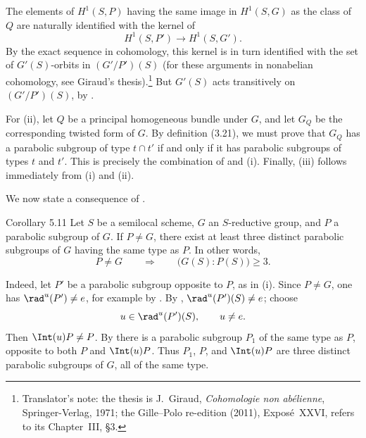 The elements of \(H^1(S,P)\) having the same image in \(H^1(S,G)\)
as the class of \(Q\) are naturally identified with the kernel of
\[
 H^1(S,P')\longrightarrow H^1(S,G').
\]
By the exact sequence in cohomology, this kernel is in turn
identified with the set of \(G'(S)\)-orbits in
\((G'/P')(S)\) (for these arguments in nonabelian cohomology, see
Giraud's thesis).\footnote{Translator's note: the thesis is J.~Giraud,
\textit{Cohomologie non abélienne}, Springer-Verlag, 1971; the Gille--Polo
re-edition (2011), Exposé~XXVI, refers to its Chapter~III, §3.}
But \(G'(S)\) acts transitively on \((G'/P')(S)\), by .

For \textup{(ii)}, let \(Q\) be a principal homogeneous bundle under
\(G\), and let \(G_Q\) be the corresponding twisted form of \(G\).
By definition \textup{(3.21)}, we must prove that \(G_Q\) has a
parabolic subgroup of type \(t\cap t'\) if and only if it has
parabolic subgroups of types \(t\) and \(t'\).  This is precisely the
combination of  and \textup{(i)}.  Finally, \textup{(iii)}
follows immediately from \textup{(i)} and \textup{(ii)}.

We now state a consequence of .

\begin{sgastatement}{Corollary 5.11}
Let \(S\) be a semilocal scheme, \(G\) an \(S\)-reductive group, and
\(P\) a parabolic subgroup of \(G\).  If \(P\ne G\), there exist at
least three distinct parabolic subgroups of \(G\) having the same
type as \(P\).  In other words,
\[
 P\ne G\qquad\Longrightarrow\qquad
 \bigl(G(S):P(S)\bigr)\geq 3.
\]
\end{sgastatement}

Indeed, let \(P'\) be a parabolic subgroup opposite to \(P\), as in
\textup{(i)}.  Since \(P\ne G\), one has
\(\rad^u(P')\ne e\), for example by .  By ,
\(\rad^u(P')(S)\ne e\); choose
\[
 u\in\rad^u(P')(S),\qquad u\ne e.
\]
Then \(\Int(u)P\ne P\).  By  there is a parabolic subgroup \(P_1\)
of the same type as \(P\), opposite to both \(P\) and \(\Int(u)P\).
Thus \(P_1\), \(P\), and \(\Int(u)P\) are three distinct parabolic
subgroups of \(G\), all of the same type.
\SGAQED
